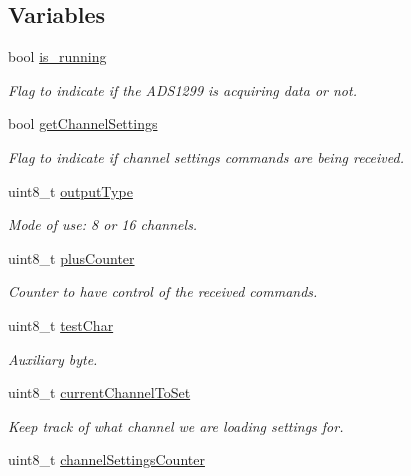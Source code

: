 \subsection*{Variables}
\begin{DoxyCompactItemize}
\item 
bool \hyperlink{group___devices___library_ga95cbd6b99430748422cc048b4f29dc52}{is\+\_\+running}
\begin{DoxyCompactList}\small\item\em Flag to indicate if the A\+D\+S1299 is acquiring data or not. \end{DoxyCompactList}\item 
bool \hyperlink{group___devices___library_ga7ef266ee79910e6754e8783b550b4a0a}{get\+Channel\+Settings}
\begin{DoxyCompactList}\small\item\em Flag to indicate if channel settings commands are being received. \end{DoxyCompactList}\item 
uint8\+\_\+t \hyperlink{group___devices___library_ga2bc20b2f7f3efa988afcd5c19b3e2edf}{output\+Type}
\begin{DoxyCompactList}\small\item\em Mode of use\+: 8 or 16 channels. \end{DoxyCompactList}\item 
uint8\+\_\+t \hyperlink{group___devices___library_gac011c12f1d5ab04cb87b6edaec1d24ad}{plus\+Counter}
\begin{DoxyCompactList}\small\item\em Counter to have control of the received commands. \end{DoxyCompactList}\item 
uint8\+\_\+t \hyperlink{group___devices___library_gae004df3f2b77e4d58eee171d2f76da40}{test\+Char}
\begin{DoxyCompactList}\small\item\em Auxiliary byte. \end{DoxyCompactList}\item 
uint8\+\_\+t \hyperlink{group___devices___library_ga15bd8e07189205b21eb37b666895ee0e}{current\+Channel\+To\+Set}
\begin{DoxyCompactList}\small\item\em Keep track of what channel we are loading settings for. \end{DoxyCompactList}\item 
uint8\+\_\+t \hyperlink{group___devices___library_gac064adc9b9dc0e68d43cf71bd52a0fdb}{channel\+Settings\+Counter}

\end{DoxyCompactItemize}
